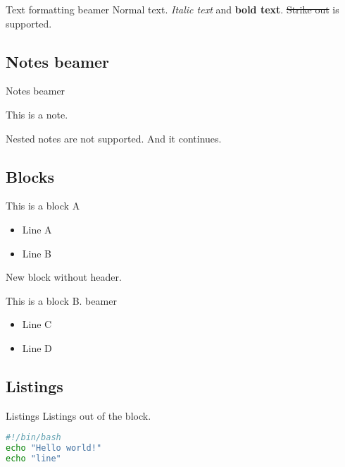 \documentclass[
  ignorenonframetext,
  aspectratio=169,
  aspectratio=169]{beamer}
\providecommand{\tightlist}{%
  \setlength{\itemsep}{0pt}\setlength{\parskip}{0pt}}
\newcommand{\st}[1]{\sout{#1}}
\providecommand{\tightlist}{%
  \setlength{\itemsep}{0pt}\setlength{\parskip}{0pt}}
\renewenvironment{quote}{\begin{customblockquote}\list{}{\rightmargin=0em\leftmargin=0em}%
\item\relax\color{blockquote-text}\ignorespaces}{\unskip\unskip\endlist\end{customblockquote}}
\begin{document}
\begin{frame}{Text formatting beamer}
Normal text. \emph{Italic text} and \textbf{bold text}. \st{Strike out}
is supported.
\end{frame}

\subsection{Notes beamer}\label{notes-beamer}

\begin{frame}{Notes beamer}
\begin{quote}
This is a note.

\begin{quote}
Nested notes are not supported. And it continues.
\end{quote}
\end{quote}
\end{frame}

\subsection{Blocks}\label{blocks}

\begin{frame}{This is a block A}
\label{this-is-a-block-a}
\begin{itemize}
\tightlist
\item
  Line A
\item
  Line B
\end{itemize}
\end{frame}

\begin{frame}{}
\label{section}
New block without header.
\end{frame}

\begin{frame}{This is a block B. beamer}
\label{this-is-a-block-b.-beamer}
\begin{itemize}
\tightlist
\item
  Line C
\item
  Line D
\end{itemize}
\end{frame}

\subsection{Listings}\label{listings}

\begin{frame}[fragile]{Listings}
Listings out of the block.

\begin{lstlisting}[language=sh]
#!/bin/bash
echo "Hello world!"
echo "line"
\end{lstlisting}
\end{frame}
\end{document}
